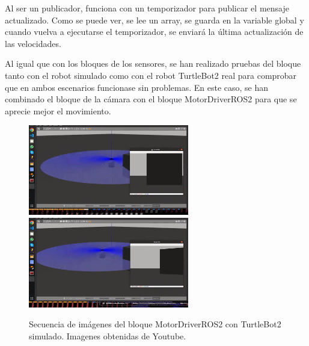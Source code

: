 Al ser un publicador, funciona con un temporizador para publicar el mensaje actualizado. Como se puede ver, se lee un array, se guarda en
la variable global y cuando vuelva a ejecutarse el temporizador, se enviará la última actualización de las velocidades.

Al igual que con los bloques de los sensores, se han realizado pruebas del bloque tanto con el robot simulado como con el robot TurtleBot2 real
para comprobar que en ambos escenarios funcionase sin problemas. En este caso, se han combinado el bloque de la cámara con el bloque MotorDriverROS2
para que se aprecie mejor el movimiento.

\begin{figure} [H]
  \begin{center}
      \includegraphics[width=7cm]{figs/c4/motorS1.png}
      \includegraphics[width=7cm]{figs/c4/motorS2.png}
  \end{center}
  \caption[Secuencia bloque cámara ROS2 simulado]{Secuencia de imágenes del bloque MotorDriverROS2 con TurtleBot2 simulado. Imagenes obtenidas de Youtube\footnotemark.}
  \label{fig:vid_motS}
\end{figure}

